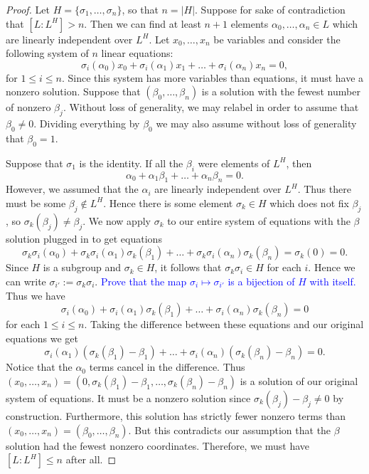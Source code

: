 \documentclass[11pt]{article}
\theoremstyle{definition}
\numberwithin{equation}{subsection}
\newcommand{\blue}[1]{\textcolor{blue}{#1}}
\begin{document}
\begin{proof}
    Let $H = \{\sigma_1,\ldots, \sigma_n\}$, so that $n = |H|$.
    Suppose for sake of contradiction that $[L : L^H] > n$.
    Then we can find at least $n + 1$ elements $\alpha_0,\ldots, \alpha_n \in L$ which are linearly independent over $L^H$.
    Let $x_0,\ldots, x_n$ be variables and consider the following system of $n$ linear equations:
    \[
        \sigma_i(\alpha_0)x_0 + \sigma_i(\alpha_1)x_1 + \ldots + \sigma_i(\alpha_n)x_n = 0,
    \]
    for $1 \leq i \leq n$.
    Since this system has more variables than equations, it must have a nonzero solution.
    Suppose that $(\beta_0,\ldots, \beta_n)$ is a solution with the fewest number of nonzero $\beta_j$.
    Without loss of generality, we may relabel in order to assume that $\beta_0 \neq 0$.
    Dividing everything by $\beta_0$ we may also assume without loss of generality that $\beta_0 = 1$.

    Suppose that $\sigma_1$ is the identity.
    If all the $\beta_i$ were elements of $L^H$, then 
    \[
        \alpha_0 + \alpha_1\beta_1 + \ldots + \alpha_n\beta_n = 0.
    \]
    However, we assumed that the $\alpha_i$ are linearly independent over $L^H$.
    Thus there must be some $\beta_j \notin L^H$.
    Hence there is some element $\sigma_{k} \in H$ which does not fix $\beta_j$, so $\sigma_k(\beta_j) \neq \beta_j$.
    We now apply $\sigma_{k}$ to our entire system of equations with the $\beta$ solution plugged in to get equations
    \[
        \sigma_k\sigma_i(\alpha_0) + \sigma_k\sigma_i(\alpha_1)\sigma_k(\beta_1) + \ldots
        + \sigma_k\sigma_i(\alpha_n)\sigma_k(\beta_n) = \sigma_k(0) = 0.
    \]
    Since $H$ is a subgroup and $\sigma_k \in H$, it follows that $\sigma_k\sigma_i \in H$ for each $i$.
    Hence we can write $\sigma_{i'} := \sigma_k\sigma_i$.
    \blue{Prove that the map $\sigma_i \mapsto \sigma_{i'}$ is a bijection of $H$ with itself.}
    Thus we have
    \[
        \sigma_i(\alpha_0) + \sigma_i(\alpha_1)\sigma_k(\beta_1) + \ldots + \sigma_i(\alpha_n)\sigma_k(\beta_n) = 0
    \]
    for each $1 \leq i \leq n$.
    Taking the difference between these equations and our original equations we get
    \[
        \sigma_i(\alpha_1)(\sigma_k(\beta_1) - \beta_1) + \ldots + \sigma_i(\alpha_n)(\sigma_k(\beta_n) - \beta_n) = 0.
    \]
    Notice that the $\alpha_0$ terms cancel in the difference.
    Thus $(x_0,\ldots, x_n) = (0,\sigma_k(\beta_1) - \beta_1,\ldots, \sigma_k(\beta_n) - \beta_n)$ is a solution of our original system of equations.
    It must be a nonzero solution since $\sigma_k(\beta_j) - \beta_j \neq 0$ by construction.
    Furthermore, this solution has strictly fewer nonzero terms than $(x_0,\ldots, x_n) = (\beta_0,\ldots, \beta_n)$.
    But this contradicts our assumption that the $\beta$ solution had the fewest nonzero coordinates.
    Therefore, we must have $[L : L^H] \leq n$ after all.
\end{proof}
\end{document}
